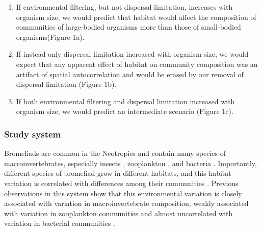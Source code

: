 \begin{enumerate}
\def\labelenumi{\arabic{enumi}.}
\item
  If environmental filtering, but not dispersal limitation, increases
  with organism size, we would predict that habitat would affect the
  composition of communities of large-bodied organisms more than those
  of small-bodied organisms(Figure 1a). 
\item
  If instead only dispersal limitation increased with organism size, we
  would expect that any apparent effect of habitat on community
  composition was an artifact of spatial autocorrelation and would be
  erased by our removal of dispersal limitation (Figure 1b).
\item
  If both environmental filtering and dispersal limitation increased
  with organism size, we would predict an intermediate scenario (Figure
  1c).
\end{enumerate}

\subsubsection{Study system}\label{study-system}

Bromeliads are common in the Neotropics and contain many species of
macroinvertebrates, especially insects \citep{Frank2009}, zooplankton
\citep{Petermann2015}, and bacteria \citep{Haubrich2009a}. Importantly,
different species of bromeliad grow in different habitats, and this
habitat variation is correlated with differences among their communities
\citep{Marino2012}. Previous observations in this system show that this
environmental variation is closely associated with variation in
macroinvertebrate composition, weakly associated with variation in
zooplankton communities and almost uncorrelated with variation in
bacterial communities \citep{Farjalla2012}.

